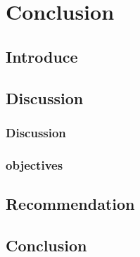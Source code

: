 \chapter{Conclusion}
\label{chap:4}

\section{Introduce}
\section{Discussion}

\subsection{Discussion}

\subsection{objectives}

\section{Recommendation}

\section{Conclusion}